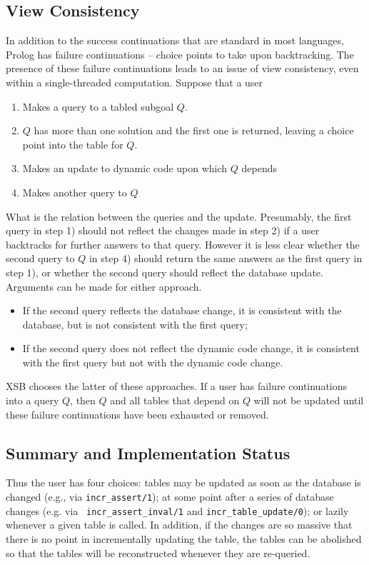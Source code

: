 \subsection{View Consistency} \label{sec:view-consistency}
%
In addition to the success continuations that are standard in most
languages, Prolog has failure continuations -- choice points to take
upon backtracking.  The presence of these failure continuations leads
to an issue of view consistency, even within a single-threaded
computation.  Suppose that a user
%
\begin{enumerate}
\item Makes a query to a tabled subgoal $Q$.  
\item $Q$ has more than one solution and the first one is returned,
  leaving a choice point into the table for $Q$.
\item Makes an update to dynamic code upon which $Q$ depends
\item Makes another query to $Q$
\end{enumerate}
%
What is the relation between the queries and the update.  Presumably,
the first query in step 1) should not reflect the changes made in step
2) if a user backtracks for further answers to that query. However it
is less clear whether the second query to $Q$ in step 4) should return
the same answers as the first query in step 1), or whether the second
query should reflect the database update.  Arguments can be made for
either approach.  
%
\begin{itemize}
\item If the second query reflects the database change, it is
  consistent with the database, but is not consistent with the first
  query; 
\item If the second query does not reflect the dynamic code change, it
  is consistent with the first query but not with the dynamic code
  change.
\end{itemize}
%
XSB chooses the latter of these approaches.  If a user has failure
continuations into a query $Q$, then $Q$ and all tables that depend on
$Q$ will not be updated until these failure continuations have been
exhausted or removed.

\subsection{Summary and Implementation Status}
%
Thus the user has four choices: tables may be updated as soon as the
database is changed (e.g., via {\tt incr\_assert/1}); at some point
after a series of database changes (e.g. via {\tt
  incr\_assert\_inval/1} and {\tt incr\_table\_update/0}); or lazily
whenever a given table is called.  In addition, if the changes are so
massive that there is no point in incrementally updating the table,
the tables can be abolished so that the tables will be reconstructed
whenever they are re-queried.

